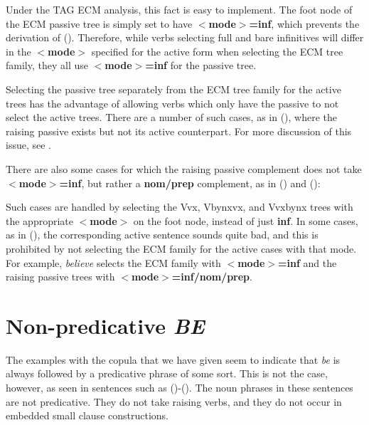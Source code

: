 {

Under the TAG ECM analysis, this fact is easy to implement.  The foot
node of the ECM passive tree is simply set to have {\bf $<$mode$>$=inf},
which prevents the derivation of ().  Therefore, while verbs
selecting full and bare infinitives will differ in the {\bf $<$mode$>$} 
specified for the active form when selecting the ECM tree family, they
all use {\bf $<$mode$>$=inf} for the passive tree.

Selecting the passive tree separately from the ECM tree family for the
active trees has the advantage of allowing verbs which only have the passive to
not select the active trees.  There are a number of such cases,
as in (), where
the raising passive exists but not its active counterpart.  For more 
discussion of this issue, see \cite{kj85}.


There are also some cases for which the raising passive complement does
not take {\bf $<$mode$>$=inf}, but rather a {\bf nom/prep} complement,
as in () and ():


Such cases are handled by selecting the Vvx, Vbynxvx, and Vvxbynx trees
with the appropriate {\bf $<$mode$>$} on the foot node, instead of just
{\bf inf}.  In some cases, as in (), the corresponding active
sentence sounds quite bad, and this is prohibited by not selecting the
ECM family for the active cases with that mode.  For example, {\it believe}
selects the ECM family with {\bf $<$mode$>$=inf} and the raising passive
trees with {\bf $<$mode$>$=inf/nom/prep}.

\section{Non-predicative {\it BE}}
\label{equative-be-xtag-analysis}

The examples with the copula that we have given seem to indicate that {\it be}
is always followed by a predicative phrase of some sort.  This is not the case,
however, as seen in sentences such as ({})-({}).  The noun phrases in
these sentences are not predicative.  They do not take raising verbs, and they
do not occur in embedded small clause constructions.

}
